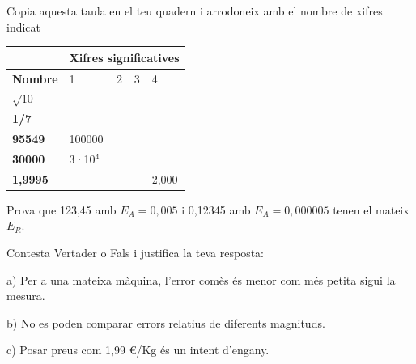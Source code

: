 \begin{mylist}
	\exer  \spen  Copia aquesta taula en el teu quadern i arrodoneix amb el nombre de xifres indicat


\begin{tabular}{|p{}|p{}|p{}|p{}|p{}|} \hline 
	\rowcolor{lightgray} \textbf{} & \multicolumn{4}{|p{2.5in}|}{\textbf{Xifres significatives}} \\ \hline 
	\textbf{Nombre} & 1 & 2 & 3 & 4 \\ \hline 
	\textbf{$\sqrt{10} $} &  &  &  &  \\ \hline 
	\textbf{1/7} &  &  &  &  \\ \hline 
	\textbf{95549} & 100000 &  &  &  \\ \hline 
	\textbf{30000} & 3·10${}^{4}$ &  &  &  \\ \hline 
	\textbf{1,9995} &  &  &  & 2,000 \\ \hline 
\end{tabular}


	\exer  Prova que 123,45 amb $E_A = 0,005$ i 0,12345 amb $E_A = 0,000005$ tenen el mateix $E_R$.
	
	\exer  Contesta Vertader o Fals i justifica la teva resposta:


a) Per a una mateixa màquina, l'error comès és menor com més petita sigui la mesura.

b) No es poden comparar errors relatius de diferents magnituds.

c) Posar preus com 1,99 €/Kg és un intent d'engany.


\end{mylist}
